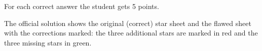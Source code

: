 For each correct answer the student gets 5 points.

The official solution shows the original (correct) star sheet and the flawed
sheet with the corrections marked: the three additional stars are marked in
red and the three missing stars in green.

